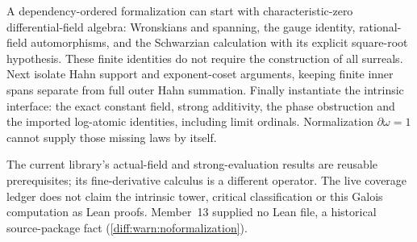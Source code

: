 \documentclass[11pt,letterpaper]{article}
\numberwithin{equation}{section}
\theoremstyle{definition}
\theoremstyle{remark}
\newcommand{\der}{\partial}
\begin{document}
\begin{remark}
\label{diff:cp:rem:formalization}
A dependency-ordered formalization can start with characteristic-zero
differential-field algebra: Wronskians and spanning, the gauge
identity, rational-field automorphisms, and the Schwarzian
calculation with its explicit square-root hypothesis. These finite
identities do not require the construction of all surreals.
Next isolate Hahn support and exponent-coset arguments, keeping
finite inner spans separate from full outer Hahn summation.
Finally instantiate the intrinsic interface: the exact constant
field, strong additivity, the phase obstruction and the imported
log-atomic identities, including limit ordinals. Normalization
$\der\omega=1$ cannot supply those missing laws by itself.

The current library's actual-field and strong-evaluation results
are reusable prerequisites; its fine-derivative calculus is a
different operator. The live coverage ledger
 does not claim the intrinsic tower,
critical classification or this Galois computation as Lean proofs.
Member~13 supplied no Lean file, a historical source-package fact
(\cref{diff:warn:noformalization}).
\end{remark}
\end{document}
